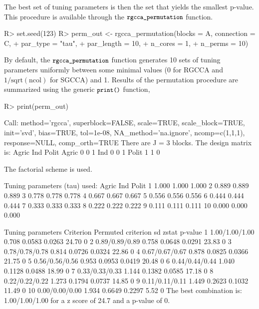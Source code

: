\documentclass[
]{jss}
\begin{document}
The best set of tuning parameters is then the set that yields the
smallest p-value. This procedure is available through the
\(\small{\texttt{rgcca\_permutation}}\) function.

\footnotesize

\begin{CodeChunk}
\begin{CodeInput}
R> set.seed(123)
R> perm_out <- rgcca_permutation(blocks = A, connection = C,
+                               par_type = "tau",
+                               par_length = 10,
+                               n_cores = 1,
+                               n_perms = 10)
\end{CodeInput}
\end{CodeChunk}

\normalsize

By default, the \(\small{\texttt{rgcca\_permutation}}\) function
generates 10 sets of tuning parameters uniformly between some minimal
values (0 for RGCCA and \(1/\text{sqrt}(\text{ncol})\) for SGCCA) and 1.
Results of the permutation procedure are summarized using the generic
\(\small{\texttt{print()}}\) function,

\footnotesize

\begin{CodeChunk}
\begin{CodeInput}
R> print(perm_out)
\end{CodeInput}
\begin{CodeOutput}
Call: method='rgcca', superblock=FALSE, scale=TRUE, scale_block=TRUE, init='svd',
bias=TRUE, tol=1e-08, NA_method='na.ignore', ncomp=c(1,1,1), response=NULL,
comp_orth=TRUE 
There are J = 3 blocks.
The design matrix is:
      Agric Ind Polit
Agric     0   0     1
Ind       0   0     1
Polit     1   1     0

The factorial scheme is used.

Tuning parameters (tau) used: 
   Agric   Ind Polit
1  1.000 1.000 1.000
2  0.889 0.889 0.889
3  0.778 0.778 0.778
4  0.667 0.667 0.667
5  0.556 0.556 0.556
6  0.444 0.444 0.444
7  0.333 0.333 0.333
8  0.222 0.222 0.222
9  0.111 0.111 0.111
10 0.000 0.000 0.000

   Tuning parameters Criterion Permuted criterion     sd zstat p-value
1     1.00/1.00/1.00     0.708             0.0583 0.0263 24.70       0
2     0.89/0.89/0.89     0.758             0.0648 0.0291 23.83       0
3     0.78/0.78/0.78     0.814             0.0726 0.0324 22.86       0
4     0.67/0.67/0.67     0.878             0.0825 0.0366 21.75       0
5     0.56/0.56/0.56     0.953             0.0953 0.0419 20.48       0
6     0.44/0.44/0.44     1.040             0.1128 0.0488 18.99       0
7     0.33/0.33/0.33     1.144             0.1382 0.0585 17.18       0
8     0.22/0.22/0.22     1.273             0.1794 0.0737 14.85       0
9     0.11/0.11/0.11     1.449             0.2623 0.1032 11.49       0
10    0.00/0.00/0.00     1.934             0.6649 0.2297  5.52       0
The best combination is: 1.00/1.00/1.00 for a z score of 24.7 and a p-value of 0.
\end{CodeOutput}
\end{CodeChunk}
\end{document}
